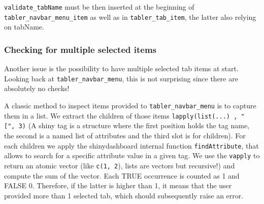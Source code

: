 \documentclass[
]{book}
\newenvironment{Shaded}{\begin{snugshade}}{\end{snugshade}}
\newcommand{\ControlFlowTok}[1]{\textcolor[rgb]{0.13,0.29,0.53}{\textbf{#1}}}
\newcommand{\DataTypeTok}[1]{\textcolor[rgb]{0.13,0.29,0.53}{#1}}
\newcommand{\KeywordTok}[1]{\textcolor[rgb]{0.13,0.29,0.53}{\textbf{#1}}}
\newcommand{\NormalTok}[1]{#1}
\newcommand{\OperatorTok}[1]{\textcolor[rgb]{0.81,0.36,0.00}{\textbf{#1}}}
\newcommand{\StringTok}[1]{\textcolor[rgb]{0.31,0.60,0.02}{#1}}
\begin{document}
\texttt{validate\_tabName} must be then inserted at the beginning of \texttt{tabler\_navbar\_menu\_item} as well as in \texttt{tabler\_tab\_item}, the latter also relying on tabName.

\hypertarget{checking-for-multiple-selected-items}{%
\subsubsection{Checking for multiple selected items}\label{checking-for-multiple-selected-items}}

Another issue is the possibility to have multiple selected tab items at start. Looking back at \texttt{tabler\_navbar\_menu}, this is not surprising since there are absolutely no checks!

\begin{Shaded}
\end{Shaded}

A classic method to inspect items provided to \texttt{tabler\_navbar\_menu} is to capture them in a list. We extract the children of those items \texttt{lapply(list(...)\ ,\ "{[}",\ 3)} (A shiny tag is a structure where the first position holds the tag name, the second is a named list of attributes and the third slot is for children). For each children we apply the shinydashboard internal function \texttt{findAttribute}, that allows to search for a specific attribute value in a given tag. We use the \texttt{vapply} to return an atomic vector (like \texttt{c(1,\ 2}), lists are vectors but recursive!) and compute the sum of the vector. Each TRUE occurrence is counted as 1 and FALSE 0. Therefore, if the latter is higher than 1, it means that the user provided more than 1 selected tab, which should subsequently raise an error.
\end{document}
